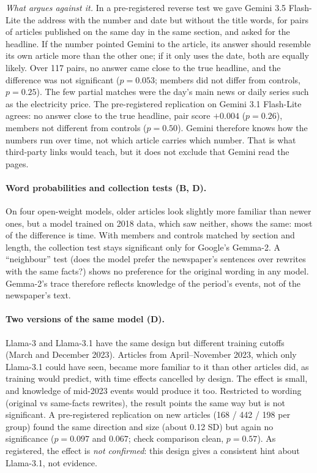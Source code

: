 \documentclass[10pt,a4paper]{article}
\begin{document}
\emph{What argues against it.} In a pre-registered reverse test we gave Gemini 3.5 Flash-Lite the address with the
number and date but without the title words, for pairs of articles published on the same day in the same section,
and asked for the headline. If the number pointed Gemini to the article, its answer should resemble its own article
more than the other one; if it only uses the date, both are equally likely. Over 117 pairs, no answer came close to
the true headline, and the difference was not significant ($p=0.053$; members did not differ from controls,
$p=0.25$). The few partial matches were the day's main news or daily series such as the electricity price. The
pre-registered replication on Gemini 3.1 Flash-Lite agrees: no answer close to the true headline, pair score $+0.004$
($p=0.26$), members not different from controls ($p=0.50$). Gemini
therefore knows how the numbers run over time, not which article carries which number. That is what third-party links
would teach, but it does not exclude that Gemini read the pages.

\paragraph{Word probabilities and collection tests (B, D).} On four open-weight models, older articles look slightly
more familiar than newer ones, but a model trained on 2018 data, which saw neither, shows the same: most of the
difference is time. With members and controls matched by section and length, the collection test stays significant
only for Google's Gemma-2. A ``neighbour'' test (does the model prefer the newspaper's sentences over rewrites with
the same facts?) shows no preference for the original wording in any model. Gemma-2's trace therefore reflects
knowledge of the period's events, not of the newspaper's text.

\paragraph{Two versions of the same model (D).} Llama-3 and Llama-3.1 have the same design but different training
cutoffs (March and December 2023). Articles from April--November 2023, which only Llama-3.1 could have seen, became
more familiar to it than other articles did, as training would predict, with time effects cancelled by design.
The effect is small, and knowledge of mid-2023 events would produce it too. Restricted to wording (original vs
same-facts rewrites), the result points the same way but is not significant. A pre-registered replication on new
articles (168 / 442 / 198 per group) found the same direction and size (about 0.12 SD) but again no significance
($p=0.097$ and $0.067$; check comparison clean, $p=0.57$). As registered, the effect is \emph{not confirmed}: this
design gives a consistent hint about Llama-3.1, not evidence.
\end{document}
